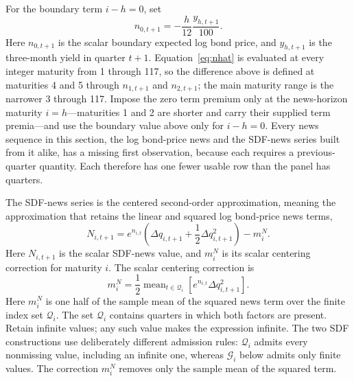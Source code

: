 \documentclass[11pt]{article}
\begin{document}
For the boundary term \(i-h=0\), set
\begin{equation}
 n_{0,t+1}=-\frac{h}{12}\frac{y_{h,t+1}}{100}.
 \label{eq:price-news-boundary}
\end{equation}
Here \(n_{0,t+1}\) is the scalar boundary expected log bond price, and \(y_{h,t+1}\) is the
three-month yield in quarter \(t+1\). Equation~\eqref{eq:nhat} is evaluated at every integer maturity
from 1 through 117, so the difference above is defined at maturities 4 and 5 through
\(n_{1,t+1}\) and \(n_{2,t+1}\); the main maturity range is the narrower 3 through 117. Impose the zero
term premium only at the news-horizon maturity \(i=h\)---maturities 1 and 2 are shorter and carry
their supplied term premia---and use the boundary value above only for \(i-h=0\). Every news sequence in this section, the log bond-price news
and the SDF-news series built from it alike, has a missing first observation, because each requires a
previous-quarter quantity. Each therefore has one fewer usable row than the panel has quarters.

The SDF-news series is the centered second-order approximation, meaning the approximation that
retains the linear and squared log bond-price news terms,
\begin{equation*}
 N_{i,t+1}=e^{n_{i,t}}\left(\Delta q_{i,t+1}
                   +\frac{1}{2}\Delta q_{i,t+1}^2\right)-m_i^{N}.
\end{equation*}
Here \(N_{i,t+1}\) is the scalar SDF-news value, and \(m_i^N\) is its scalar centering correction for
maturity \(i\). The scalar centering correction is
\begin{equation*}
 m_i^{N}=\frac{1}{2}\operatorname{mean}_{t\in\mathcal Q_i}
       \left[e^{n_{i,t}}\Delta q_{i,t+1}^2\right].
\end{equation*}
Here \(m_i^N\) is one half of the sample mean of the squared news term over the finite index set
\(\mathcal Q_i\). The set \(\mathcal Q_i\) contains quarters in which both factors are present. Retain
infinite values; any such value makes the expression infinite. The two SDF constructions use
deliberately different admission rules: \(\mathcal Q_i\) admits every nonmissing value, including an
infinite one, whereas \(\mathcal G_i\) below admits only finite values. The correction \(m_i^N\)
removes only the sample mean of the squared term.
\end{document}
